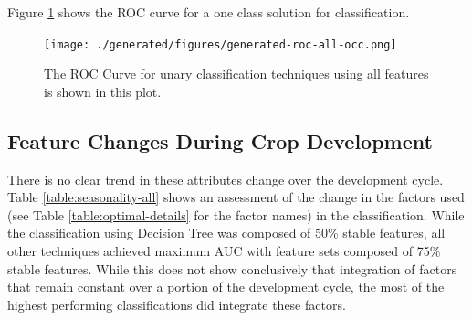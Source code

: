 \documentclass[letterpaper, notitlepage]{report}
\begin{document}
{

}

Figure \ref{fig:roc-occ} shows the ROC curve for a one class solution for classification. 
 
\begin{figure}[!htbp]
	\centering
	\texttt{[image: ./generated/figures/generated-roc-all-occ.png]}
	\caption[ROC Curve for unary classification using all features]{The ROC Curve for unary classification techniques using all features is shown in this plot.}
	\label{fig:roc-occ}
\end{figure}


\subsection{Feature Changes During Crop Development}
There is no clear trend in these attributes change over the development cycle. Table \ref{table:seasonality-all} shows an assessment of the change in the factors used (see Table \ref{table:optimal-details} for the factor names) in the classification. While the classification using Decision Tree was composed of 50\% stable features, all other techniques achieved maximum AUC with feature sets composed of 75\% stable features. While this does not show conclusively that integration of factors that remain constant over a portion of the development cycle, the most of the highest performing classifications did integrate these factors.
{


}
%
%
%

%
% 
\end{document}
